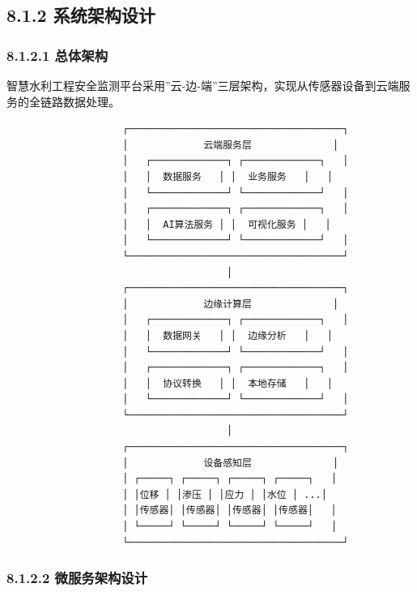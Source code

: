 \subsection{8.1.2
系统架构设计}\label{ux7cfbux7edfux67b6ux6784ux8bbeux8ba1}

\subsubsection{8.1.2.1 总体架构}\label{ux603bux4f53ux67b6ux6784}

智慧水利工程安全监测平台采用''云-边-端''三层架构，实现从传感器设备到云端服务的全链路数据处理。

\begin{lstlisting}
                    ┌─────────────────────────────────────┐
                    │             云端服务层              │
                    │   ┌─────────────┐ ┌─────────────┐   │
                    │   │  数据服务   │ │  业务服务   │   │
                    │   └─────────────┘ └─────────────┘   │
                    │   ┌─────────────┐ ┌─────────────┐   │
                    │   │  AI算法服务 │ │  可视化服务 │   │
                    │   └─────────────┘ └─────────────┘   │
                    └─────────────────────────────────────┘
                                      │
                    ┌─────────────────────────────────────┐
                    │             边缘计算层              │
                    │   ┌─────────────┐ ┌─────────────┐   │
                    │   │  数据网关   │ │  边缘分析   │   │
                    │   └─────────────┘ └─────────────┘   │
                    │   ┌─────────────┐ ┌─────────────┐   │
                    │   │  协议转换   │ │  本地存储   │   │
                    │   └─────────────┘ └─────────────┘   │
                    └─────────────────────────────────────┘
                                      │
                    ┌─────────────────────────────────────┐
                    │             设备感知层              │
                    │ ┌─────┐ ┌─────┐ ┌─────┐ ┌─────┐   │
                    │ │位移 │ │渗压 │ │应力 │ │水位 │ ...│
                    │ │传感器│ │传感器│ │传感器│ │传感器│   │
                    │ └─────┘ └─────┘ └─────┘ └─────┘   │
                    └─────────────────────────────────────┘
\end{lstlisting}

\subsubsection{8.1.2.2
微服务架构设计}\label{ux5faeux670dux52a1ux67b6ux6784ux8bbeux8ba1}

